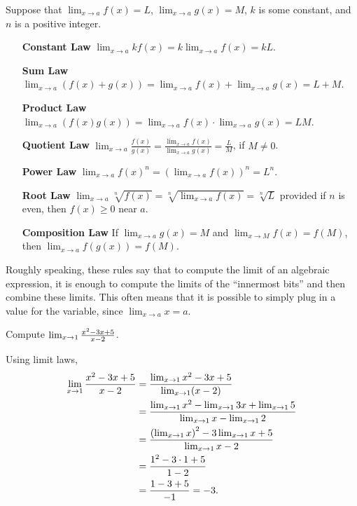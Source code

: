 \begin{mainTheorem}\label{theorem:limit-laws}
Suppose that $\lim_{x\to a}f(x)=L$, $\lim_{x\to a}g(x)=M$, $k$
is some constant, and $n$ is a positive integer.
\begin{itemize}
\item[\textbf{Constant Law}] $\lim_{x\to a} kf(x) = k\lim_{x\to a}f(x)=kL$.
\item[\textbf{Sum Law}] $\lim_{x\to a} (f(x)+g(x)) = \lim_{x\to a}f(x)+\lim_{x\to a}g(x)=L+M$.  
\item[\textbf{Product Law}] $\lim_{x\to a} (f(x)g(x)) = \lim_{x\to a}f(x)\cdot\lim_{x\to a}g(x)=LM$. 
\item[\textbf{Quotient Law}] $\lim_{x\to a} \frac{f(x)}{g(x)} =
  \frac{\lim_{x\to a}f(x)}{\lim_{x\to a}g(x)}=\frac{L}{M}$, if $M\ne0$.
\item[\textbf{Power Law}] $\lim_{x\to a} f(x)^n = \left(\lim_{x\to a}f(x)\right)^n=L^n$.
\item[\textbf{Root Law}] $\lim_{x\to a} \sqrt[n]{f(x)} = \sqrt[n]{\lim_{x\to
    a}f(x)}=\sqrt[n]{L}$ provided if $n$ is even, then $f(x)\ge 0$
  near $a$.
\item[\textbf{Composition Law}] If $\lim_{x\to a}g(x)=M$ and
  $\lim_{x\to M}f(x) = f(M)$, then $\lim_{x\to a} f(g(x)) = f(M)$.
\end{itemize}
\label{thm:limit laws}
\end{mainTheorem}

Roughly speaking, these rules say that to compute the limit of an
algebraic expression, it is enough to compute the limits of the
``innermost bits'' and then combine these limits. This often means
that it is possible to simply plug in a value for the variable, since
$\lim_{x\to a} x =a$.


\begin{example}
Compute $\lim_{x\to 1}{x^2-3x+5\over x-2}$. 
\end{example}
\begin{solution}
Using limit laws, 
\begin{align*}
\lim_{x\to 1}{x^2-3x+5\over x-2}&=
\dfrac{\lim_{x\to 1}x^2-3x+5}{\lim_{x\to1}(x-2)} \\
&=\frac{\lim_{x\to 1}x^2-\lim_{x\to1}3x+\lim_{x\to1}5}{\lim_{x\to1}x-\lim_{x\to1}2} \\
&=\dfrac{\left(\lim_{x\to 1}x\right)^2-3\lim_{x\to1}x+5}{\lim_{x\to1}x-2} \\
&=\dfrac{1^2-3\cdot1+5}{1-2} \\
&=\dfrac{1-3+5}{-1} = -3.
\end{align*}
\end{solution}


